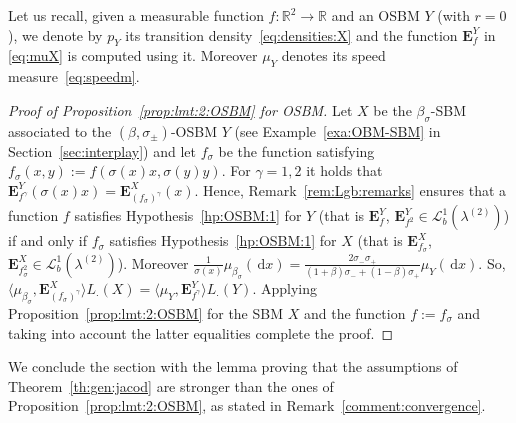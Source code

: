 \documentclass[12pt]{article}
\numberwithin{equation}{section}
\theoremstyle{definition}
\theoremstyle{remark}
\newcommand{\RR}{\mathbb{R}}
\newcommand{\vd}{\,\mathrm{d}}
\newcommand{\Lgb}[1]{\mathcal{L}^{1}_{b}(\lambda^{(#1)})}
\newcommand{\bfF}[1]{\mathbf{E}^X_{#1}}
\newcommand{\bfH}[1]{\mathbf{E}^Y_{#1}}
\begin{document}

Let us recall, given a measurable function $f\colon \RR^2 \to \RR$ and an OSBM $Y$ (with $r=0$), we denote by $p_Y$ its transition density~\eqref{eq:densities:X} and the function $\bfH{f}$ in \eqref{eq:muX} is computed using it. Moreover $\mu_Y$ denotes its speed measure~\eqref{eq:speedm}.


\begin{proof}[Proof of Proposition~\ref{prop:lmt:2:OSBM} for OSBM]
Let $X$ be the $\beta_\sigma$-SBM associated to the $(\beta,\sigma_\pm)$-OSBM $Y$ (see Example~\ref{exa:OBM-SBM} in Section~\ref{sec:interplay}) 
and let $f_\sigma$ be the function satisfying $f_\sigma(x,y):=f(\sigma(x)x, \sigma(y)y)$. 
%
%
For $\gamma=1,2$ it holds that
$
	\bfH {f^\gamma}(\sigma(x) x)= \bfF{(f_\sigma)^\gamma}(x)
$.
%
%
%
Hence, Remark~\ref{rem:Lgb:remarks} ensures that a function $f$ satisfies Hypothesis~\ref{hp:OSBM:1} for $Y$ (that is $\bfH{f}$, $\bfH{f^2} \in \Lgb{2}$) 
if and only if $f_\sigma$ satisfies Hypothesis~\ref{hp:OSBM:1} for $X$ (that is $\bfF{f_\sigma}$, $\bfF{f_\sigma^2} \in \Lgb{2}$). 
Moreover 
$\frac1{\sigma(x)}\mu_{\beta_\sigma}(\!\vd x) = \frac{2\sigma_-\sigma_+}{(1+\beta)\sigma_-+(1-\beta)\sigma_+} \mu_Y (\!\vd x)$.
So, 
$
		\langle \mu_{\beta_\sigma} , \bfF{(f_\sigma)^\gamma} \rangle  L_{\cdot}(X) = \langle \mu_Y , \bfH {f^\gamma} \rangle
 L_{\cdot}(Y)
$.
Applying Proposition~\ref{prop:lmt:2:OSBM} for the SBM $X$ and the function $f:=f_\sigma$ and taking into account the latter equalities complete the proof.
\end{proof}



We conclude the section with the lemma proving that the assumptions of Theorem~\ref{th:gen:jacod} are stronger than the ones of Proposition~\ref{prop:lmt:2:OSBM}, as stated in Remark~\ref{comment:convergence}.
\end{document}
